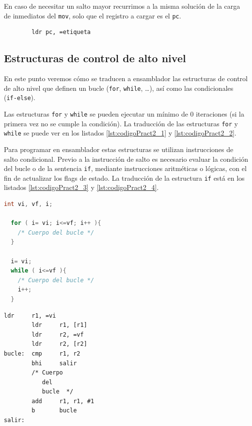 En caso de necesitar un salto mayor recurrimos
a la misma solución de la carga de inmediatos del {\tt mov}, solo que el
registro a cargar es el {\tt pc}.

\begin{lstlisting}
        ldr pc, =etiqueta
\end{lstlisting}

\subsection{Estructuras de control de alto nivel}

En este punto veremos cómo se traducen a ensamblador las estructuras
de control de alto nivel que definen un bucle ({\tt for}, {\tt while},
\dots), así como las condicionales ({\tt if-else}).

Las estructuras {\tt for} y {\tt while} se pueden ejecutar un mínimo de 0
iteraciones (si la primera vez no se cumple la condición). La traducción de
las estructuras {\tt for} y {\tt while} se puede ver en los listados
\ref{lst:codigoPract2_1} y \ref{lst:codigoPract2_2}.

Para programar en ensamblador estas estructuras se utilizan instrucciones
de salto condicional. Previo a la instrucción de salto es necesario evaluar
la condición del bucle o de la sentencia {\tt if}, mediante instrucciones
aritméticas o lógicas, con el fin de actualizar los flags de estado. La
traducción de la estructura {\tt if} está en los listados
\ref{lst:codigoPract2_3} y \ref{lst:codigoPract2_4}.

\begin{lstlisting}[caption={Estructura del for y while en C (tipos1.c)},label={lst:codigoPract2_1},language=C]
  int vi, vf, i;

  for ( i= vi; i<=vf; i++ ){ 
    /* Cuerpo del bucle */
  }

  i= vi; 
  while ( i<=vf ){ 
    /* Cuerpo del bucle */
    i++; 
  }
\end{lstlisting}

\begin{lstlisting}[caption={Traducción de las estructuras {\tt for} y {\tt while}.
Hemos supuesto que el valor inicial está en la variable {\tt vi}
y el valor final en  la variable {\tt vf} y se ha utilizado el
registro {\tt r1} como índice de las iteraciones {\tt i}.},label={lst:codigoPract2_2}]
        ldr     r1, =vi
        ldr     r1, [r1]
        ldr     r2, =vf
        ldr     r2, [r2]
bucle:  cmp     r1, r2
        bhi     salir
        /* Cuerpo
           del
           bucle  */
        add     r1, r1, #1
        b       bucle
salir:
\end{lstlisting}

